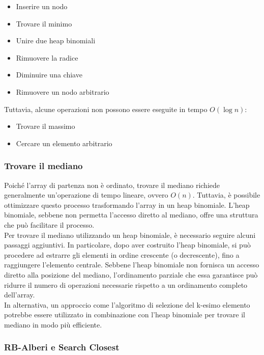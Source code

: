 \documentclass[a4paper]{article}
\begin{document}
\begin{itemize}
  \item Inserire un nodo
  \item Trovare il minimo
  \item Unire due heap binomiali
  \item Rimuovere la radice
  \item Diminuire una chiave
  \item Rimuovere un nodo arbitrario
\end{itemize}

Tuttavia, alcune operazioni non possono essere eseguite in tempo \( O(\log n) \):

\begin{itemize}
  \item Trovare il massimo
  \item Cercare un elemento arbitrario
\end{itemize}


\subsubsection{Trovare il mediano}

Poiché l'array di partenza non è ordinato, trovare il mediano richiede generalmente un'operazione di tempo lineare, ovvero \(O(n)\). Tuttavia, è possibile ottimizzare questo processo trasformando l'array in un heap binomiale. L'heap binomiale, sebbene non permetta l'accesso diretto al mediano, offre una struttura che può facilitare il processo.
\\
Per trovare il mediano utilizzando un heap binomiale, è necessario seguire alcuni passaggi aggiuntivi. In particolare, dopo aver costruito l'heap binomiale, si può procedere ad estrarre gli elementi in ordine crescente (o decrescente), fino a raggiungere l'elemento centrale. Sebbene l'heap binomiale non fornisca un accesso diretto alla posizione del mediano, l'ordinamento parziale che essa garantisce può ridurre il numero di operazioni necessarie rispetto a un ordinamento completo dell'array.
\\
In alternativa, un approccio come l'algoritmo di selezione del k-esimo elemento potrebbe essere utilizzato in combinazione con l'heap binomiale per trovare il mediano in modo più efficiente. 

\subsubsection{RB-Alberi e Search Closest}
\end{document}
